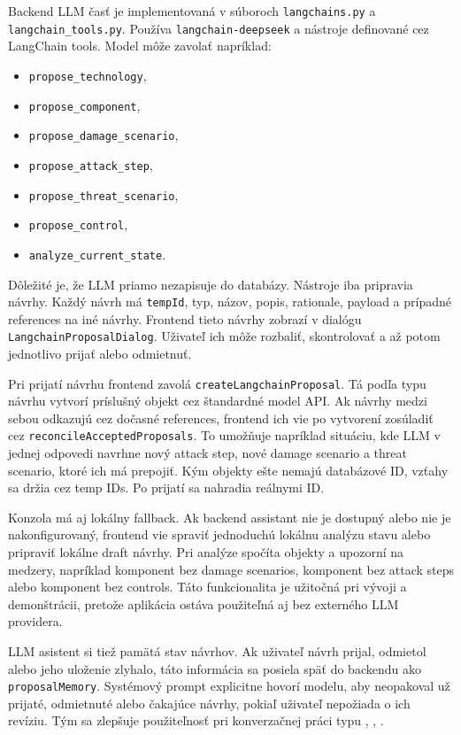 \documentclass[11pt]{article}
\begin{document}
Backend LLM časť je implementovaná v súboroch \texttt{langchains.py} a \texttt{langchain\_tools.py}. Používa \texttt{langchain-deepseek} a nástroje definované cez LangChain tools. Model môže zavolať napríklad:

\begin{itemize}
    \item \texttt{propose\_technology},
    \item \texttt{propose\_component},
    \item \texttt{propose\_damage\_scenario},
    \item \texttt{propose\_attack\_step},
    \item \texttt{propose\_threat\_scenario},
    \item \texttt{propose\_control},
    \item \texttt{analyze\_current\_state}.
\end{itemize}

Dôležité je, že LLM priamo nezapisuje do databázy. Nástroje iba pripravia návrhy. Každý návrh má \texttt{tempId}, typ, názov, popis, rationale, payload a prípadné references na iné návrhy. Frontend tieto návrhy zobrazí v dialógu \texttt{LangchainProposalDialog}. Uživateľ ich môže rozbaliť, skontrolovať a až potom jednotlivo prijať alebo odmietnuť.

Pri prijatí návrhu frontend zavolá \texttt{createLangchainProposal}. Tá podľa typu návrhu vytvorí príslušný objekt cez štandardné model API. Ak návrhy medzi sebou odkazujú cez dočasné references, frontend ich vie po vytvorení zosúladiť cez \texttt{reconcileAcceptedProposals}. To umožňuje napríklad situáciu, kde LLM v jednej odpovedi navrhne nový attack step, nové damage scenario a threat scenario, ktoré ich má prepojiť. Kým objekty ešte nemajú databázové ID, vzťahy sa držia cez temp IDs. Po prijatí sa nahradia reálnymi ID.

Konzola má aj lokálny fallback. Ak backend assistant nie je dostupný alebo nie je nakonfigurovaný, frontend vie spraviť jednoduchú lokálnu analýzu stavu alebo pripraviť lokálne draft návrhy. Pri analýze spočíta objekty a upozorní na medzery, napríklad komponent bez damage scenarios, komponent bez attack steps alebo komponent bez controls. Táto funkcionalita je užitočná pri vývoji a demonštrácii, pretože aplikácia ostáva použiteľná aj bez externého LLM providera.

LLM asistent si tiež pamätá stav návrhov. Ak uživateľ návrh prijal, odmietol alebo jeho uloženie zlyhalo, táto informácia sa posiela späť do backendu ako \texttt{proposalMemory}. Systémový prompt explicitne hovorí modelu, aby neopakoval už prijaté, odmietnuté alebo čakajúce návrhy, pokiaľ uživateľ nepožiada o ich revíziu. Tým sa zlepšuje použiteľnosť pri konverzačnej práci typu , , .
\end{document}
